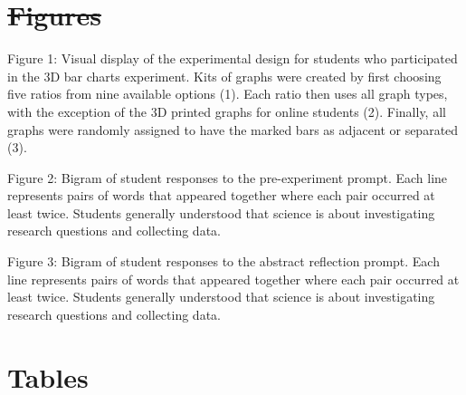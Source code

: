 \documentclass[
  12pt,
]{article}
\providecommand{\DIFadd}[1]{{\protect\color{blue}\uwave{#1}}} %
\providecommand{\DIFdel}[1]{{\protect\color{red}\sout{#1}}}                      %
\providecommand{\DIFaddbegin}{} %
\providecommand{\DIFaddend}{} %
\providecommand{\DIFdelbegin}{} %
\providecommand{\DIFdelend}{} %
\newcommand{\DIFscaledelfig}{0.5}
\newlength{\DIFdelgraphicswidth} %
\newlength{\DIFdelgraphicsheight} %
\newcommand{\DIFaddincludegraphics}[2][]{{\color{blue}\fbox{\DIFOincludegraphics[#1]{#2}}}} %
\newcommand{\DIFdelincludegraphics}[2][]{%
\sbox{\DIFdelgraphicsbox}{\DIFOincludegraphics[#1]{#2}}%
\settoboxwidth{\DIFdelgraphicswidth}{\DIFdelgraphicsbox} %
\settoboxtotalheight{\DIFdelgraphicsheight}{\DIFdelgraphicsbox} %
\scalebox{\DIFscaledelfig}{%
\parbox[b]{\DIFdelgraphicswidth}{\usebox{\DIFdelgraphicsbox}\\[-\baselineskip] \rule{\DIFdelgraphicswidth}{0em}}\llap{\resizebox{\DIFdelgraphicswidth}{\DIFdelgraphicsheight}{%
\setlength{\unitlength}{\DIFdelgraphicswidth}%
\begin{picture}(1,1)%
\thicklines\linethickness{2pt} %
{\color[rgb]{1,0,0}\put(0,0){\framebox(1,1){}}}%
{\color[rgb]{1,0,0}\put(0,0){\line( 1,1){1}}}%
{\color[rgb]{1,0,0}\put(0,1){\line(1,-1){1}}}%
\end{picture}%
}\hspace*{3pt}}} %
} %
\DeclareRobustCommand{\DIFaddbegin}{\DIFOaddbegin \let\includegraphics\DIFaddincludegraphics} %
\DeclareRobustCommand{\DIFaddend}{\DIFOaddend \let\includegraphics\DIFOincludegraphics} %
\DeclareRobustCommand{\DIFdelbegin}{\DIFOdelbegin \let\includegraphics\DIFdelincludegraphics} %
\DeclareRobustCommand{\DIFdelend}{\DIFOaddend \let\includegraphics\DIFOincludegraphics} %
\begin{document}
\newpage

\section{\DIFdelbegin \DIFdel{Figures}\DIFdelend \DIFaddbegin \DIFadd{Figure legends}\DIFaddend }\DIFdelbegin %
\DIFdelend \DIFaddbegin \label{figure-legends}
\DIFaddend 

Figure 1: Visual display of the experimental design for students who
participated in the 3D bar charts experiment. Kits of graphs were
created by first choosing five ratios from nine available options (1).
Each ratio then uses all graph types, with the exception of the 3D
printed graphs for online students (2). Finally, all graphs were
randomly assigned to have the marked bars as adjacent or separated (3).

Figure 2: Bigram of student responses \DIFaddbegin \DIFadd{(n=82) }\DIFaddend to the pre-experiment
prompt. Each line represents pairs of words that appeared together where
each pair occurred at least twice. Students generally understood that
science is about investigating research questions and collecting data.

Figure 3: Bigram of student responses \DIFaddbegin \DIFadd{(n=63) }\DIFaddend to the abstract reflection
prompt. Each line represents pairs of words that appeared together where
each pair occurred at least twice. Students generally understood that
science is about investigating research questions and collecting data.

\newpage

\section{Tables}\label{tables}
\end{document}
